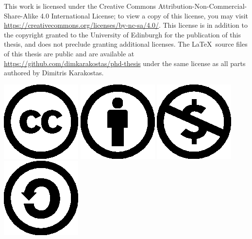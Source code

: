 \cleardoublepage
\vspace*{.35\textheight}
{
  \noindent
  This work is licensed under the Creative Commons
  Attribution-Non-Commercial-Share-Alike 4.0 International License; to view a
  copy of this license, you may visit
  \url{https://creativecommons.org/licenses/by-nc-sa/4.0/}. This license is in
  addition to the copyright granted to the University of Edinburgh for the
  publication of this thesis, and does not preclude granting additional
  licenses. The \LaTeX\ source files of this thesis are public and are available at
  \url{https://github.com/dimkarakostas/phd-thesis} under the same license as
  all parts authored by Dimitris Karakostas.
}

\begin{center}
  \includegraphics[scale=.5]{figures/copyright/cc.eps}
  \includegraphics[scale=.5]{figures/copyright/by.eps}
  \includegraphics[scale=.5]{figures/copyright/nc.eps}
  \includegraphics[scale=.5]{figures/copyright/sa.eps}
\end{center}
\clearpage
